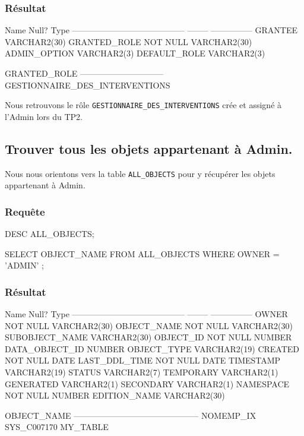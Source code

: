\documentclass[•]{article}
\begin{document}
\subsubsection{Résultat}
\begin{sql}
 Name                                      Null?    Type
 ----------------------------------------- -------- ---------------
 GRANTEE                                            VARCHAR2(30)
 GRANTED_ROLE                              NOT NULL VARCHAR2(30)
 ADMIN_OPTION                                       VARCHAR2(3)
 DEFAULT_ROLE                                       VARCHAR2(3)


GRANTED_ROLE
------------------------------
GESTIONNAIRE_DES_INTERVENTIONS
 \end{sql}
 
 Nous retrouvons le rôle \texttt{GESTIONNAIRE\_DES\_INTERVENTIONS} crée et assigné à l'Admin lors du TP2.

\subsection{Trouver tous les objets appartenant à Admin.}
Nous nous orientons vers la table \texttt{ALL\_OBJECTS} pour y récupérer les objets appartenant à Admin.

\subsubsection{Requête}
\begin{sql}
DESC ALL_OBJECTS;

SELECT OBJECT_NAME 
FROM ALL_OBJECTS 
WHERE OWNER = 'ADMIN' ;
\end{sql}

\subsubsection{Résultat}
\begin{sql}
 Name                                      Null?    Type
 ----------------------------------------- -------- ---------------
 OWNER                                     NOT NULL VARCHAR2(30)
 OBJECT_NAME                               NOT NULL VARCHAR2(30)
 SUBOBJECT_NAME                                     VARCHAR2(30)
 OBJECT_ID                                 NOT NULL NUMBER
 DATA_OBJECT_ID                                     NUMBER
 OBJECT_TYPE                                        VARCHAR2(19)
 CREATED                                   NOT NULL DATE
 LAST_DDL_TIME                             NOT NULL DATE
 TIMESTAMP                                          VARCHAR2(19)
 STATUS                                             VARCHAR2(7)
 TEMPORARY                                          VARCHAR2(1)
 GENERATED                                          VARCHAR2(1)
 SECONDARY                                          VARCHAR2(1)
 NAMESPACE                                 NOT NULL NUMBER
 EDITION_NAME                                       VARCHAR2(30)
 

OBJECT_NAME
---------------------------------------------
NOMEMP_IX
SYS_C007170
MY_TABLE
\end{sql}
\end{document}
